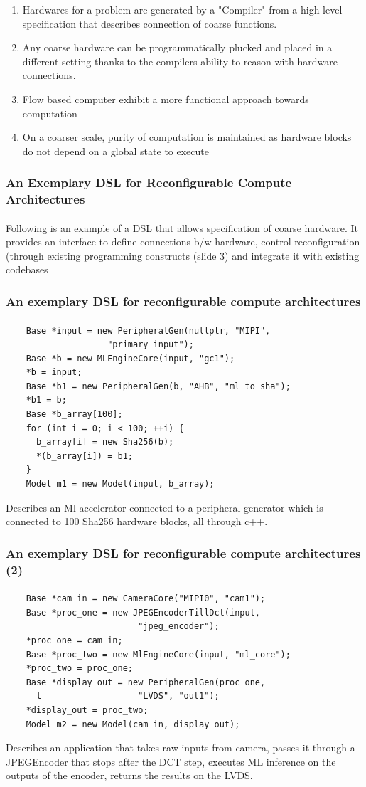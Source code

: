 \documentclass{beamer}
\begin{document}
{\begin{frame}[fragile]
\begin{enumerate}
    \item Hardwares for a problem are generated by a "Compiler" from a high-level
      specification that describes connection of coarse functions.
    \item Any coarse hardware can be programmatically plucked and placed in a
      different setting thanks to the compilers ability to reason with hardware
      connections.
    \item Flow based computer exhibit a more functional approach towards
      computation
    \item On a coarser scale, purity of computation is maintained as hardware
      blocks do not depend on a global state to execute
  \end{enumerate}
\end{frame}

\begin{frame}[fragile]
  \frametitle{An Exemplary DSL for Reconfigurable Compute Architectures}
\framesubtitle{}
  Following is an example of a DSL that allows specification of coarse hardware.
  It provides an interface to define connections b/w hardware, control
  reconfiguration (through existing programming constructs (slide 3) and
  integrate it with existing codebases

\end{frame}

\begin{frame}[fragile]
  \frametitle{An exemplary DSL for reconfigurable compute architectures}
\framesubtitle{}
  \begin{verbatim}
    Base *input = new PeripheralGen(nullptr, "MIPI", 
                    "primary_input");
    Base *b = new MLEngineCore(input, "gc1");
    *b = input;
    Base *b1 = new PeripheralGen(b, "AHB", "ml_to_sha");
    *b1 = b;
    Base *b_array[100];
    for (int i = 0; i < 100; ++i) {
      b_array[i] = new Sha256(b);
      *(b_array[i]) = b1;
    }
    Model m1 = new Model(input, b_array);
  \end{verbatim}

  Describes an Ml accelerator connected to a peripheral generator
  which is connected to 100 Sha256 hardware blocks, all through c++.
\end{frame}

\begin{frame}[fragile]
  \frametitle{An exemplary DSL for reconfigurable compute architectures (2)}
\framesubtitle{}
  \begin{verbatim}
    Base *cam_in = new CameraCore("MIPI0", "cam1");
    Base *proc_one = new JPEGEncoderTillDct(input, 
                          "jpeg_encoder");
    *proc_one = cam_in;
    Base *proc_two = new MlEngineCore(input, "ml_core");
    *proc_two = proc_one;
    Base *display_out = new PeripheralGen(proc_one, 
      l                   "LVDS", "out1");
    *display_out = proc_two;
    Model m2 = new Model(cam_in, display_out);
  \end{verbatim}
  Describes an application that takes raw inputs from camera, passes it through
  a JPEGEncoder that stops after the DCT step, executes ML inference on the
  outputs of the encoder, returns the results on the LVDS.


\end{frame}}
\end{document}
